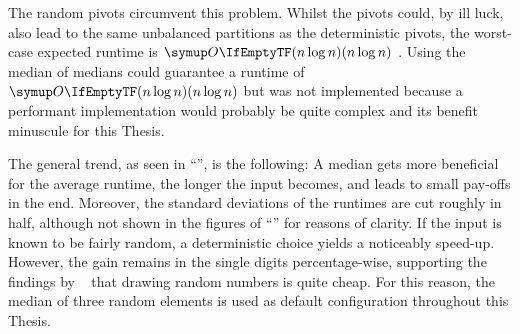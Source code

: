 The random pivots circumvent this problem.
Whilst the pivots could, by ill luck, also lead to the same unbalanced partitions as the deterministic pivots, the worst-case expected runtime is \(\bigoh{n \log n}\) \cite{blum2011probabilistic}.
Using the median of medians \cite{blum1973median} could guarantee a runtime of \(\bigoh{n \log n}\) but was not implemented because a performant implementation would probably be quite complex and its benefit minuscule for this Thesis.

The general trend, as seen in \enquote{}, is the following:
A median gets more beneficial for the average runtime, the longer the input becomes, and leads to small pay-offs in the end.
Moreover, the standard deviations of the runtimes are cut roughly in half, although not shown in the figures of \enquote{} for reasons of clarity.
If the input is known to be fairly random, a deterministic choice yields a noticeably speed-up.
However, the gain remains in the single digits percentage-wise, supporting the findings by \citeauthor{lukas_geis}~\cite{lukas_geis} that drawing random numbers is quite cheap.
For this reason, the median of three random elements is used as default configuration throughout this Thesis.




